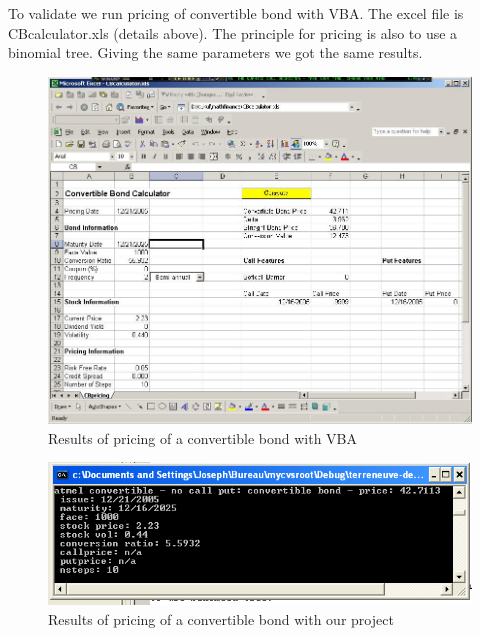 To validate we run pricing of convertible bond with VBA. The excel
file is CBcalculator.xls (details above). The principle for pricing
is also to use a binomial tree. Giving the same parameters we got
the same results.

\begin{figure}
\begin{center}
        \includegraphics[width=12cm]{cbexample.jpg}
        \caption{Results of pricing of a convertible bond with VBA}
\end{center}
\end{figure}
\begin{figure}
\begin{center}
        \includegraphics[width=12cm]{cbexample2.jpg}
        \caption{Results of pricing of a convertible bond with our project}
\end{center}
\end{figure}


